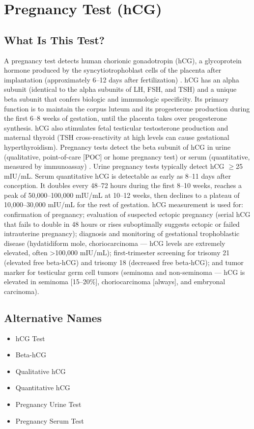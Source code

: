 \chapter{Pregnancy Test (hCG)}
\section*{What Is This Test?}
A pregnancy test detects human chorionic gonadotropin (hCG), a glycoprotein hormone produced by the syncytiotrophoblast cells of the placenta after implantation (approximately 6--12 days after fertilization) \cite{wilcox1999time}. hCG has an alpha subunit (identical to the alpha subunits of LH, FSH, and TSH) and a unique beta subunit that confers biologic and immunologic specificity. Its primary function is to maintain the corpus luteum and its progesterone production during the first 6--8 weeks of gestation, until the placenta takes over progesterone synthesis. hCG also stimulates fetal testicular testosterone production and maternal thyroid (TSH cross-reactivity at high levels can cause gestational hyperthyroidism). Pregnancy tests detect the beta subunit of hCG in urine (qualitative, point-of-care [POC] or home pregnancy test) or serum (quantitative, measured by immunoassay) \cite{chard1992pregnancy}. Urine pregnancy tests typically detect hCG $\geq$25 mIU/mL. Serum quantitative hCG is detectable as early as 8--11 days after conception. It doubles every 48--72 hours during the first 8--10 weeks, reaches a peak of 50,000--100,000 mIU/mL at 10--12 weeks, then declines to a plateau of 10,000--30,000 mIU/mL for the rest of gestation. hCG measurement is used for: confirmation of pregnancy; evaluation of suspected ectopic pregnancy (serial hCG that fails to double in 48 hours or rises suboptimally suggests ectopic or failed intrauterine pregnancy); diagnosis and monitoring of gestational trophoblastic disease (hydatidiform mole, choriocarcinoma --- hCG levels are extremely elevated, often >100,000 mIU/mL); first-trimester screening for trisomy 21 (elevated free beta-hCG) and trisomy 18 (decreased free beta-hCG); and tumor marker for testicular germ cell tumors (seminoma and non-seminoma --- hCG is elevated in seminoma [15--20\%], choriocarcinoma [always], and embryonal carcinoma).
\section*{Alternative Names}
\begin{itemize}
  \item hCG Test
  \item Beta-hCG
  \item Qualitative hCG
  \item Quantitative hCG
  \item Pregnancy Urine Test
  \item Pregnancy Serum Test
\end{itemize}
